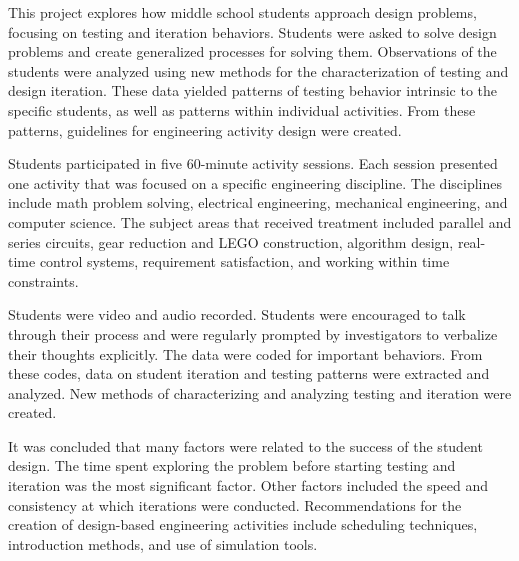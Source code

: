 % 
% 
%

This project explores how middle school students approach design problems, focusing on testing and iteration behaviors. Students were asked to solve design problems and create generalized processes for solving them. Observations of the students were analyzed using new methods for the characterization of testing and design iteration. These data yielded patterns of testing behavior intrinsic to the specific students, as well as patterns  within individual activities. From these patterns, guidelines for engineering activity design were created.

Students participated in five 60-minute activity sessions. Each session presented one activity that was focused on a specific engineering discipline. The disciplines include math problem solving, electrical engineering, mechanical engineering, and computer science. The subject areas that received treatment included parallel and series circuits, gear reduction and LEGO construction, algorithm design, real-time control systems, requirement satisfaction, and working within time constraints.

Students were video and audio recorded. Students were encouraged to talk through their process and were regularly prompted by investigators to verbalize their thoughts explicitly. The data were coded for important behaviors. From these codes, data on student iteration and testing patterns were extracted and analyzed. New methods of characterizing and analyzing testing and iteration were created. 

It was concluded that many factors were related to the success of the student design. The time spent exploring the problem before starting testing and iteration was the most significant factor. Other factors included the speed and consistency at which iterations were conducted. Recommendations for the creation of design-based engineering activities include scheduling techniques, introduction methods, and use of simulation tools.